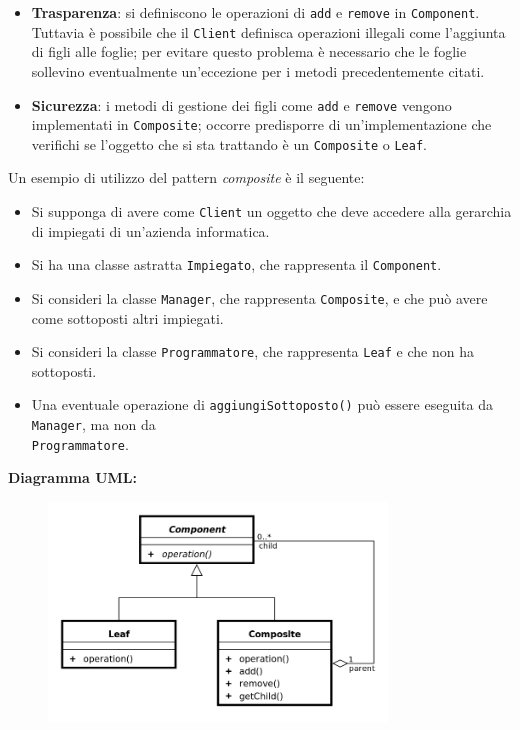 \begin{solution}
\begin{itemize}
\item \textbf{Trasparenza}: si definiscono le operazioni di \texttt{add} e \texttt{remove} in \texttt{Component}.
Tuttavia è possibile che il \texttt{Client} definisca operazioni illegali come l'aggiunta di figli alle foglie; per evitare questo problema è necessario che le foglie sollevino eventualmente un'eccezione per i metodi precedentemente citati.
	\item \textbf{Sicurezza}: i metodi di gestione dei figli come \texttt{add} e \texttt{remove} vengono implementati in \texttt{Composite}; occorre predisporre di un'implementazione che verifichi se l'oggetto che si sta trattando è un \texttt{Composite} o \texttt{Leaf}.
\end{itemize}
Un esempio di utilizzo del pattern \textit{composite} è il seguente:
\begin{itemize}
\item Si supponga di avere come \texttt{Client} un oggetto che deve accedere alla gerarchia di impiegati di un'azienda informatica.
\item Si ha una classe astratta \texttt{Impiegato}, che rappresenta il \texttt{Component}.
\item Si consideri la classe \texttt{Manager}, che rappresenta \texttt{Composite}, e che può avere come sottoposti altri impiegati.
\item Si consideri la classe \texttt{Programmatore}, che rappresenta \texttt{Leaf} e che non ha sottoposti.
\item Una eventuale operazione di \texttt{aggiungiSottoposto()} può essere eseguita da \texttt{Manager}, ma non da
\\
\texttt{Programmatore}.
\end{itemize}
\textbf{Diagramma UML:}
\begin{figure}[htb!]
	\centering
	\label{ObserverPattern}
	\includegraphics[width=9cm]{./immagini/compositePattern.png}
\end{figure}
\end{solution}


